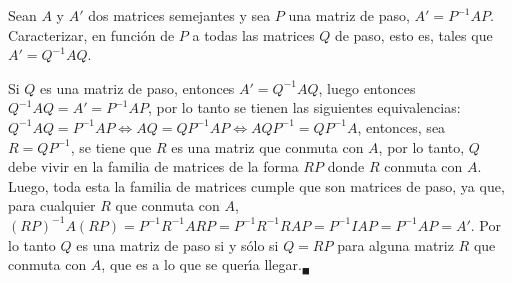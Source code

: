 \begin{enunciado}
 Sean $A$ y $A'$ dos matrices semejantes y sea $P$ una matriz de paso, $A' = P^{-1}AP$. Caracterizar, en funci\'on de $P$ a todas las matrices $Q$ de paso, esto es, tales que $A' = Q^{-1}AQ$.
\end{enunciado}

\begin{solucion}
 Si $Q$ es una matriz de paso, entonces $A' = Q^{-1}AQ$, luego entonces $Q^{-1}AQ = A' = P^{-1}AP$, por lo tanto se tienen las siguientes equivalencias: $Q^{-1}AQ = P^{-1}AP \Leftrightarrow AQ = QP^{-1}AP \Leftrightarrow AQP^{-1} = QP^{-1}A$, entonces, sea $R = QP^{-1}$, se tiene que $R$ es una matriz que conmuta con $A$, por lo tanto, $Q$ debe vivir en la familia de matrices de la forma $RP$ donde $R$ conmuta con $A$. Luego, toda esta la familia de matrices cumple que son matrices de paso, ya que, para cualquier $R$ que conmuta con $A$, $(RP)^{-1}A(RP) = P^{-1}R^{-1}ARP = P^{-1}R^{-1}RAP = P^{-1}IAP = P^{-1}AP = A'$. Por lo tanto $Q$ es una matriz de paso si y s\'olo si $Q = RP$ para alguna matriz $R$ que conmuta con $A$, que es a lo que se quer\'{\i}a llegar.${}_{\blacksquare}$
\end{solucion}
